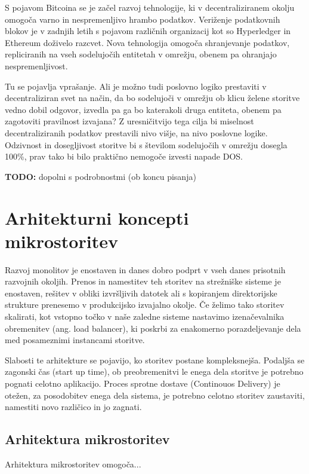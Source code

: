 \documentclass[a4paper, 12pt]{book}
\begin{document}
S pojavom Bitcoina se je začel razvoj tehnologije, ki v decentraliziranem okolju omogoča varno in nespremenljivo hrambo podatkov.
Veriženje podatkovnih blokov je v zadnjih letih s pojavom različnih organizacij kot so Hyperledger in Ethereum doživelo razcvet.
Nova tehnologija omogoča shranjevanje podatkov, repliciranih na vseh sodelujočih entitetah v omrežju, obenem pa ohranjajo nespremenljivost.

Tu se pojavlja vprašanje. 
Ali je možno tudi poslovno logiko prestaviti v decentraliziran svet na način, da bo sodelujoči v omrežju ob klicu želene storitve vedno dobil odgovor, izvedla pa ga bo katerakoli druga entiteta, obenem pa zagotoviti pravilnost izvajana?
Z uresničitvijo tega cilja bi miselnost decentraliziranih podatkov prestavili nivo višje, na nivo poslovne logike.
Odzivnost in dosegljivost storitve bi s številom sodelujočih v omrežju dosegla 100\%, prav tako bi bilo praktično nemogoče izvesti napade DOS.

\textbf{TODO:} dopolni s podrobnostmi (ob koncu pisanja)


\chapter{Arhitekturni koncepti mikrostoritev}
\label{ch1}

Razvoj monolitov je enostaven in danes dobro podprt v vseh danes prisotnih razvojnih okoljih.
Prenos in namestitev teh storitev na strežniške sisteme je enostaven, rešitev v obliki izvršljivih datotek ali s kopiranjem direktorijske strukture prenesemo v produkcijsko izvajalno okolje.
Če želimo tako storitev skalirati, kot vstopno točko v naše zaledne sisteme nastavimo izenačevalnika obremenitev (ang. load balancer), ki poskrbi za enakomerno porazdeljevanje dela med posameznimi instancami storitve.

Slabosti te arhitekture se pojavijo, ko storitev postane kompleksnejša.
Podaljša se zagonski čas (start up time), ob preobremenitvi le enega dela storitve je potrebno pognati celotno aplikacijo.
Proces sprotne dostave (Continouos Delivery) je otežen, za posodobitev enega dela sistema, je potrebno celotno storitev zaustaviti, namestiti novo različico in jo zagnati. \cite{monolithMicroservice}


\section{Arhitektura mikrostoritev}

Arhitektura mikrostoritev omogoča...
\end{document}
